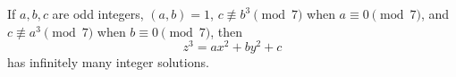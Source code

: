 \begin{proposition}
    If $a,b,c$ are odd integers, $(a,b)=1$, $c\not\equiv b^3\pmod7$ when $a\equiv0\pmod7$, and $c\not\equiv a^3\pmod7$ when $b\equiv0\pmod7$, then
\[
    z^3=ax^2+by^2+c
\]
    has infinitely many integer solutions.
\end{proposition}
